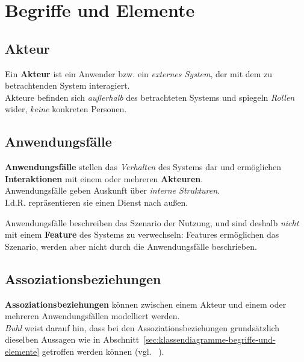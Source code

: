 \section{Begriffe und Elemente}

\subsection{Akteur}

Ein \textbf{Akteur} ist ein Anwender {bzw.} ein \textit{externes System}, der mit dem zu betrachtenden System interagiert.\\

\noindent
Akteure befinden sich \textit{außerhalb} des betrachteten Systems und spiegeln \textit{Rollen} wider, \textit{keine} konkreten Personen.


\subsection{Anwendungsfälle}
\textbf{Anwendungsfälle} stellen das \textit{Verhalten} des Systems dar und ermöglichen \textbf{Interaktionen} mit einem oder mehreren \textbf{Akteuren}.\\

\noindent
Anwendungsfälle geben  Auskunft über \textit{interne Strukturen}.\\
I.d.R. repräsentieren sie einen Dienst nach außen.\\

\begin{tcolorbox}
Anwendungsfälle beschreiben das Szenario der Nutzung, und sind deshalb \textit{nicht} mit einem \textbf{Feature} des Systems zu verwechseln: Features ermöglichen das Szenario, werden aber nicht durch die Anwendungsfälle beschrieben.
\end{tcolorbox}


\subsection{Assoziationsbeziehungen}

\textbf{Assoziationsbeziehungen} können zwischen einem Akteur und einem oder mehreren Anwendungsfällen modelliert werden.\\

\noindent
\textit{Buhl} weist darauf hin, dass bei den Assoziationsbeziehungen grundsätzlich dieselben Aussagen wie in Abschnitt~\ref{sec:klassendiagramme-begriffe-und-elemente} getroffen werden können (vgl. ~\cite[52]{Buh09}).\\

